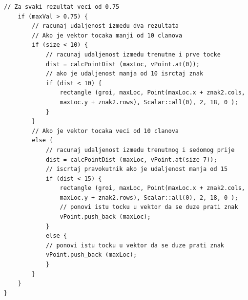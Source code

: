 \newpage
\begin{lstlisting}[label=lstFP2,caption={Izvorni kod eliminacije
lažno pozitivnih rezultata}]
    // Za svaki rezultat veci od 0.75 
    if (maxVal > 0.75) {
        // racunaj udaljenost izmedu dva rezultata
        // Ako je vektor tocaka manji od 10 clanova
        if (size < 10) {
            // racunaj udaljenost izmedu trenutne i prve tocke
            dist = calcPointDist (maxLoc, vPoint.at(0));
            // ako je udaljenost manja od 10 isrctaj znak
            if (dist < 10) {
                rectangle (groi, maxLoc, Point(maxLoc.x + znak2.cols, 
                maxLoc.y + znak2.rows), Scalar::all(0), 2, 18, 0 );
            }
        }
        // Ako je vektor tocaka veci od 10 clanova
        else {
            // racunaj udaljenost izmedu trenutnog i sedomog prije 
            dist = calcPointDist (maxLoc, vPoint.at(size-7));  
            // iscrtaj pravokutnik ako je udaljenost manja od 15 
            if (dist < 15) {
                rectangle (groi, maxLoc, Point(maxLoc.x + znak2.cols, 
                maxLoc.y + znak2.rows), Scalar::all(0), 2, 18, 0 );
                // ponovi istu tocku u vektor da se duze prati znak
                vPoint.push_back (maxLoc);  
            }
            else {
            // ponovi istu tocku u vektor da se duze prati znak
            vPoint.push_back (maxLoc);
            }
        }
    }
}
\end{lstlisting}





